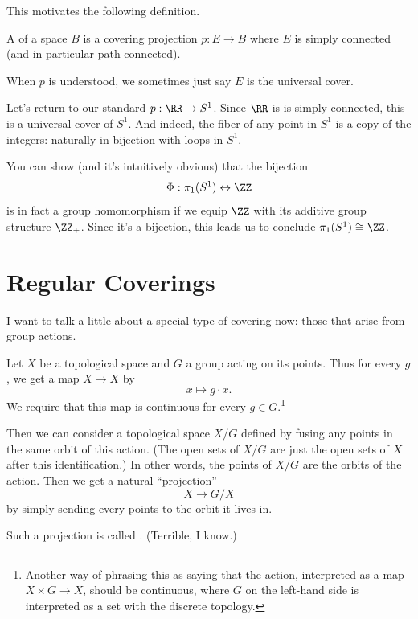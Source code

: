 This motivates the following definition.
\begin{definition}
	A  of a space $B$ is a covering projection
	$p : E \to B$ where $E$ is simply connected (and in particular path-connected).
\end{definition}
\begin{abuse}
	When $p$ is understood, we sometimes just say $E$ is the universal cover.
\end{abuse}

\begin{example}
	Let's return to our standard $p : \RR \to S^1$.
	Since $\RR$ is is simply connected, this is a universal cover of $S^1$.
	And indeed, the fiber of any point in $S^1$
	is a copy of the integers: naturally in bijection with loops in $S^1$.
	
	You can show (and it's intuitively obvious) that the bijection
	\[ \Phi : \pi_1(S^1) \leftrightarrow \ZZ \]
	is in fact a group homomorphism if we equip $\ZZ$ with its
	additive group structure $\ZZ_+$.
	Since it's a bijection, this leads us to conclude $\pi_1(S^1) \cong \ZZ$.
\end{example}

\section{Regular Coverings}
I want to talk a little about a special type of covering now: those
that arise from group actions.

Let $X$ be a topological space and $G$ a group acting on its points.
Thus for every $g$, we get a map $X \to X$ by 
\[ x \mapsto g \cdot x. \]
We require that this map is continuous for every $g \in G$.\footnote{%
	Another way of phrasing this as saying that the action,
	interpreted as a map $X \times G \to X$, should be continuous,
	where $G$ on the left-hand side is interpreted as a set with
	the discrete topology.}

Then we can consider a topological space $X/G$ defined by fusing any points
in the same orbit of this action.
(The open sets of $X/G$ are just the open sets of $X$ after this identification.)
In other words, the points of $X/G$ are the orbits of the action.
Then we get a natural ``projection''
\[ X \to G/X \]
by simply sending every points to the orbit it lives in.
\begin{definition}
	Such a projection is called .
	(Terrible, I know.)
\end{definition}


